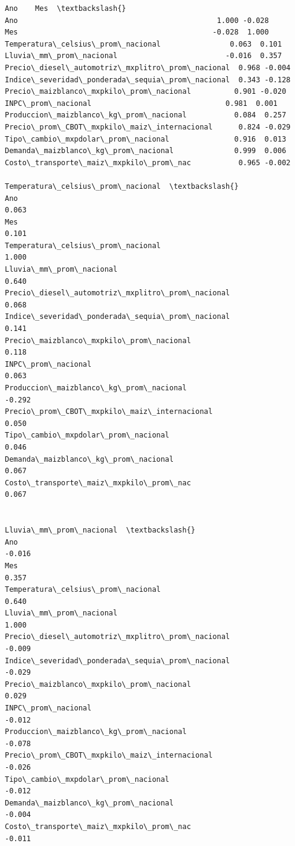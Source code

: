 \documentclass[11pt]{article}
\makeatletter
\newcommand{\boxspacing}{\kern\kvtcb@left@rule\kern\kvtcb@boxsep}
\newcommand{\prompt}[4]{
        {\ttfamily\llap{{\color{#2}[#3]:\hspace{3pt}#4}}\vspace{-\baselineskip}}
    }
\makeatother
\begin{document}
            \begin{tcolorbox}[breakable, size=fbox, boxrule=.5pt, pad at break*=1mm, opacityfill=0]
\prompt{Out}{outcolor}{28}{\boxspacing}
\begin{Verbatim}[commandchars=\\\{\}]
                                                   Ano    Mes  \textbackslash{}
Ano                                              1.000 -0.028
Mes                                             -0.028  1.000
Temperatura\_celsius\_prom\_nacional                0.063  0.101
Lluvia\_mm\_prom\_nacional                         -0.016  0.357
Precio\_diesel\_automotriz\_mxplitro\_prom\_nacional  0.968 -0.004
Indice\_severidad\_ponderada\_sequia\_prom\_nacional  0.343 -0.128
Precio\_maizblanco\_mxpkilo\_prom\_nacional          0.901 -0.020
INPC\_prom\_nacional                               0.981  0.001
Produccion\_maizblanco\_kg\_prom\_nacional           0.084  0.257
Precio\_prom\_CBOT\_mxpkilo\_maiz\_internacional      0.824 -0.029
Tipo\_cambio\_mxpdolar\_prom\_nacional               0.916  0.013
Demanda\_maizblanco\_kg\_prom\_nacional              0.999  0.006
Costo\_transporte\_maiz\_mxpkilo\_prom\_nac           0.965 -0.002

Temperatura\_celsius\_prom\_nacional  \textbackslash{}
Ano
0.063
Mes
0.101
Temperatura\_celsius\_prom\_nacional
1.000
Lluvia\_mm\_prom\_nacional
0.640
Precio\_diesel\_automotriz\_mxplitro\_prom\_nacional
0.068
Indice\_severidad\_ponderada\_sequia\_prom\_nacional
0.141
Precio\_maizblanco\_mxpkilo\_prom\_nacional
0.118
INPC\_prom\_nacional
0.063
Produccion\_maizblanco\_kg\_prom\_nacional
-0.292
Precio\_prom\_CBOT\_mxpkilo\_maiz\_internacional
0.050
Tipo\_cambio\_mxpdolar\_prom\_nacional
0.046
Demanda\_maizblanco\_kg\_prom\_nacional
0.067
Costo\_transporte\_maiz\_mxpkilo\_prom\_nac
0.067

                                                 Lluvia\_mm\_prom\_nacional  \textbackslash{}
Ano                                                               -0.016
Mes                                                                0.357
Temperatura\_celsius\_prom\_nacional                                  0.640
Lluvia\_mm\_prom\_nacional                                            1.000
Precio\_diesel\_automotriz\_mxplitro\_prom\_nacional                   -0.009
Indice\_severidad\_ponderada\_sequia\_prom\_nacional                   -0.029
Precio\_maizblanco\_mxpkilo\_prom\_nacional                            0.029
INPC\_prom\_nacional                                                -0.012
Produccion\_maizblanco\_kg\_prom\_nacional                            -0.078
Precio\_prom\_CBOT\_mxpkilo\_maiz\_internacional                       -0.026
Tipo\_cambio\_mxpdolar\_prom\_nacional                                -0.012
Demanda\_maizblanco\_kg\_prom\_nacional                               -0.004
Costo\_transporte\_maiz\_mxpkilo\_prom\_nac                            -0.011


\end{Verbatim}
\end{tcolorbox}
\end{document}
